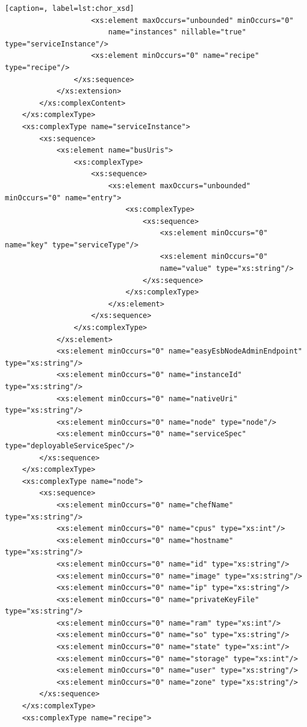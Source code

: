 \documentclass[a4paper, 10pt]{article}
\begin{document}
{\begin{lstlisting}[caption=, label=lst:chor_xsd]
                    <xs:element maxOccurs="unbounded" minOccurs="0"
                        name="instances" nillable="true" type="serviceInstance"/>
                    <xs:element minOccurs="0" name="recipe" type="recipe"/>
                </xs:sequence>
            </xs:extension>
        </xs:complexContent>
    </xs:complexType>
    <xs:complexType name="serviceInstance">
        <xs:sequence>
            <xs:element name="busUris">
                <xs:complexType>
                    <xs:sequence>
                        <xs:element maxOccurs="unbounded" minOccurs="0" name="entry">
                            <xs:complexType>
                                <xs:sequence>
                                    <xs:element minOccurs="0" name="key" type="serviceType"/>
                                    <xs:element minOccurs="0"
                                    name="value" type="xs:string"/>
                                </xs:sequence>
                            </xs:complexType>
                        </xs:element>
                    </xs:sequence>
                </xs:complexType>
            </xs:element>
            <xs:element minOccurs="0" name="easyEsbNodeAdminEndpoint" type="xs:string"/>
            <xs:element minOccurs="0" name="instanceId" type="xs:string"/>
            <xs:element minOccurs="0" name="nativeUri" type="xs:string"/>
            <xs:element minOccurs="0" name="node" type="node"/>
            <xs:element minOccurs="0" name="serviceSpec" type="deployableServiceSpec"/>
        </xs:sequence>
    </xs:complexType>
    <xs:complexType name="node">
        <xs:sequence>
            <xs:element minOccurs="0" name="chefName" type="xs:string"/>
            <xs:element minOccurs="0" name="cpus" type="xs:int"/>
            <xs:element minOccurs="0" name="hostname" type="xs:string"/>
            <xs:element minOccurs="0" name="id" type="xs:string"/>
            <xs:element minOccurs="0" name="image" type="xs:string"/>
            <xs:element minOccurs="0" name="ip" type="xs:string"/>
            <xs:element minOccurs="0" name="privateKeyFile" type="xs:string"/>
            <xs:element minOccurs="0" name="ram" type="xs:int"/>
            <xs:element minOccurs="0" name="so" type="xs:string"/>
            <xs:element minOccurs="0" name="state" type="xs:int"/>
            <xs:element minOccurs="0" name="storage" type="xs:int"/>
            <xs:element minOccurs="0" name="user" type="xs:string"/>
            <xs:element minOccurs="0" name="zone" type="xs:string"/>
        </xs:sequence>
    </xs:complexType>
    <xs:complexType name="recipe">

\end{lstlisting}}
\end{document}
